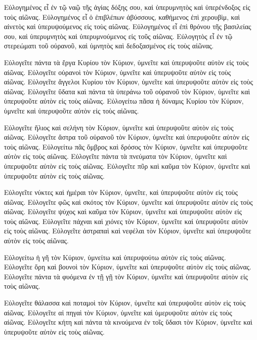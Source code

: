 {\par }{\PP {}Εὐλογημένος εἶ ἐν τῷ ναῷ τῆς ἁγίας δόξης σου, καὶ ὑπερυμνητὸς καὶ ὑπερένδοξος εἰς τοὺς αἰῶνας.
Εὐλογημένος εἶ ὁ ἐπιβλέπων ἀβύσσους, καθήμενος ἐπὶ χερουβὶμ, καὶ αἰνετὸς καὶ ὑπερυψούμενος εἰς τοὺς αἰῶνας.
Εὐλογημένος εἶ ἐπὶ θρόνου τῆς βασιλείας σου, καὶ ὑπερυμνητὸς καὶ ὑπερυμνούμενος εἰς τοῦς αἰῶνας.
Εὐλογητὸς εἶ ἐν τῷ στερεώματι τοῦ οὐρανοῦ, καὶ ὑμνητὸς καὶ δεδοξασμένος εἰς τοὺς αἰῶνας.
\par }{\PP {}Εὐλογεῖτε πάντα τὰ ἔργα Κυρίου τὸν Κύριον, ὑμνεῖτε καὶ ὑπερυψοῦτε αὐτὸν εἰς τοὺς αἰῶνας.
Εὐλογεῖτε οὐρανοὶ τὸν Κύριον, ὑμνεῖτε καὶ ὑπερυψοῦτε αὐτὸν εἰς τοὺς αἰῶνας.
Εὐλογεῖτε ἄγγελοι Κυρίου τὸν Κύριον, ὑμνεῖτε καὶ ὑπερυψοῦτε αὐτὸν εἰς τοὺς αἰῶνας.
Εὐλογεῖτε ὕδατα καὶ πάντα τὰ ὑπεράνω τοῦ οὐρανοῦ τὸν Κύριον, ὑμνεῖτε καὶ ὑπερυψοῦτε αὐτὸν εἰς τοὺς αἰῶνας.
Εὐλογείτω πᾶσα ἡ δύναμις Κυρίου τὸν Κύριον, ὑμνεῖτε καὶ ὑπερυψοῦτε αὐτὸν εἰς τοὺς αἰῶνας.
\par }{\PP {}Εὐλογεῖτε ἥλιος καὶ σελήνη τὸν Κύριον, ὑμνεῖτε καὶ ὑπερυψοῦτε αὐτὸν εἰς τοὺς αἰῶνας.
Εὐλογεῖτε ἄστρα τοῦ οὐρανοῦ τὸν Κύριον, ὑμνεῖτε καὶ ὑπερυψοῦτε αὐτὸν εἰς τοὺς αἰῶνας.
Εὐλογείτω πᾶς ὄμβρος καὶ δρόσος τὸν Κύριον, ὑμνεῖτε καὶ ὑπερυψοῦτε αὐτὸν εἰς τοὺς αἰῶνας.
Εὐλογεῖτε πάντα τὰ πνεύματα τὸν Κύριον, ὑμνεῖτε καὶ ὑπερυψοῦτε αὐτὸν εἰς τοὺς αἰῶνας.
Εὐλογεῖτε πῦρ καὶ καῦμα τὸν Κύριον, ὑμνεῖτε καὶ ὑπερυψοῦτε αὐτὸν εἰς τοὺς αἰῶνας.
\par }{\PP {}Εὐλογεῖτε νύκτες καὶ ἡμέραι τὸν Κύριον, ὑμνεῖτε, καὶ ὑπερυψοῦτε αὐτὸν εἰς τοὺς αἰῶνας.
Εὐλογεῖτε φῶς καὶ σκότος τὸν Κύριον, ὑμνεῖτε καὶ ὑπερυψοῦτε αὐτὸν εἰς τοὺς αἰῶνας.
Εὐλογεῖτε ψύχος καὶ καῦμα τὸν Κύριον, ὑμνεῖτε καὶ ὑπερυψοῦτε αὐτὸν εἰς τοὺς αἰῶνας.
Εὐλογεῖτε πάχναι καὶ χιόνες τὸν Κύριον, ὑμνεῖτε καὶ ὑπερυψοῦτε αὐτὸν εἰς τοὺς αἰῶνας.
Εὐλογεῖτε ἀστραπαὶ καὶ νεφέλαι τὸν Κύριον, ὑμνεῖτε καὶ ὑπερυψοῦτε αὐτὸν εἰς τοὺς αἰῶνας.
\par }{\PP {}Εὐλογείτω ἡ γῆ τὸν Κύριον, ὑμνείτω καὶ ὑπερυψούτω αὐτὸν εἰς τοὺς αἰῶνας.
Εὐλογεῖτε ὄρη καὶ βουνοὶ τὸν Κύριον, ὑμνεῖτε καὶ ὑπερυψοῦτε αὐτὸν εἰς τοὺς αἰῶνας.
Εὐλογεῖτε πάντα τὰ φυόμενα ἐν τῇ γῇ τὸν Κύριον, ὑμνεῖτε καὶ ὑπερυψοῦτε αὐτὸν εἰς τοὺς αἰῶνας.
\par }{\PP {}Εὐλογεῖτε θάλασσα καὶ ποταμοὶ τὸν Κύριον, ὑμνεῖτε καὶ ὑπερυψοῦτε αὐτὸν εἰς τοὺς αἰῶνας.
Εὐλογεῖτε αἱ πηγαὶ τὸν Κύριον, ὑμνεῖτε καὶ ὑμερυψοῦτε αὐτὸν εἰς τοὺς αἰῶνας.
Εὐλογεῖτε κήτη καὶ πάντα τὰ κινούμενα ἐν τοῖς ὕδασι τὸν Κύριον, ὑμνεῖτε καὶ ὑπερυψοῦτε αὐτὸν εἰς τοὺς αἰῶνας.
}
